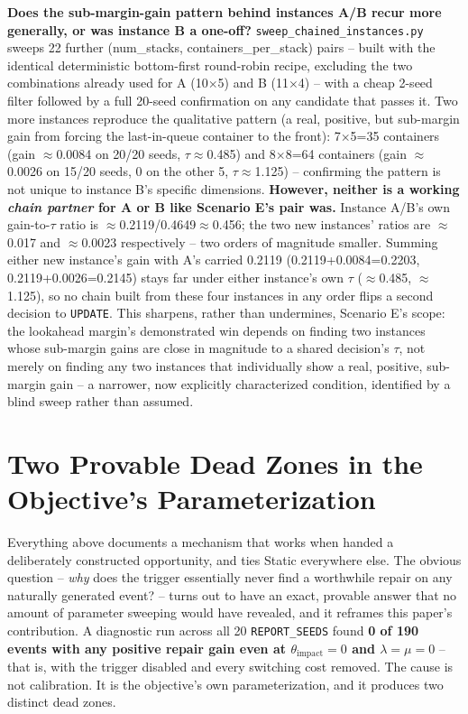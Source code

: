 \documentclass[11pt]{article}
\begin{document}
\textbf{Does the sub-margin-gain pattern behind instances A/B recur more
generally, or was instance B a one-off?} \texttt{sweep\_chained\_instances.py}
sweeps 22 further (num\_stacks, containers\_per\_stack) pairs -- built with
the identical deterministic bottom-first round-robin recipe, excluding the
two combinations already used for A (10$\times$5) and B (11$\times$4) --
with a cheap 2-seed filter followed by a full 20-seed confirmation on any
candidate that passes it. Two more instances reproduce the qualitative
pattern (a real, positive, but sub-margin gain from forcing the
last-in-queue container to the front): 7$\times$5=35 containers (gain
$\approx$0.0084 on 20/20 seeds, $\tau\approx$0.485) and 8$\times$8=64
containers (gain $\approx$0.0026 on 15/20 seeds, 0 on the other 5,
$\tau\approx$1.125) -- confirming the pattern is not unique to instance
B's specific dimensions. \textbf{However, neither is a working
\emph{chain partner} for A or B like Scenario E's pair was.} Instance
A/B's own gain-to-$\tau$ ratio is $\approx$0.2119/0.4649$\approx$0.456;
the two new instances' ratios are $\approx$0.017 and $\approx$0.0023
respectively -- two orders of magnitude smaller. Summing either new
instance's gain with A's carried 0.2119 (0.2119+0.0084=0.2203,
0.2119+0.0026=0.2145) stays far under either instance's own $\tau$
($\approx$0.485, $\approx$1.125), so no chain built from these four
instances in any order flips a second decision to \texttt{UPDATE}. This
sharpens, rather than undermines, Scenario E's scope: the lookahead
margin's demonstrated win depends on finding two instances whose
sub-margin gains are close in magnitude to a shared decision's $\tau$, not
merely on finding any two instances that individually show a real,
positive, sub-margin gain -- a narrower, now explicitly characterized
condition, identified by a blind sweep rather than assumed.

\section{Two Provable Dead Zones in the Objective's Parameterization}
\label{sec:dead-zones}

Everything above documents a mechanism that works when handed a
deliberately constructed opportunity, and ties Static everywhere else. The
obvious question -- \emph{why} does the trigger essentially never find a
worthwhile repair on any naturally generated event? -- turns out to have an
exact, provable answer that no amount of parameter sweeping would have
revealed, and it reframes this paper's contribution. A diagnostic run
across all 20 \texttt{REPORT\_SEEDS} found \textbf{0 of 190 events with any
positive repair gain even at $\theta_{\text{impact}}=0$ and
$\lambda=\mu=0$} -- that is, with the trigger disabled and every switching
cost removed. The cause is not calibration. It is the objective's own
parameterization, and it produces two distinct dead zones.
\end{document}

